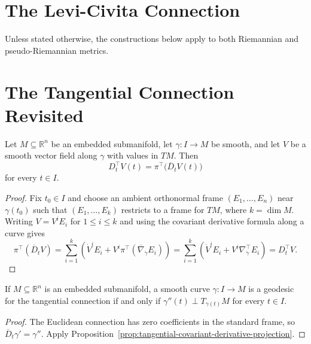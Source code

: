 \section{The Levi-Civita Connection}

Unless stated otherwise, the constructions below apply to both Riemannian and
pseudo-Riemannian metrics.

\section{The Tangential Connection Revisited}

\begin{proposition}
\label{prop:tangential-covariant-derivative-projection}

Let $M \subseteq \mathbb{R}^n$ be an embedded submanifold, let
$\gamma:I\to M$ be smooth, and let $V$ be a smooth vector field along
$\gamma$ with values in $TM$. Then
\[
D_t^\top V(t)=\pi^\top\bigl(\overline D_tV(t)\bigr)
\]
for every $t\in I$.

\begin{proof}
\sketch Fix $t_0\in I$ and choose an ambient orthonormal frame
$(E_1,\ldots,E_n)$ near $\gamma(t_0)$ such that
$(E_1,\ldots,E_k)$ restricts to a frame for $TM$, where $k=\dim M$.
Writing $V=V^iE_i$ for $1\leq i\leq k$ and using the covariant derivative
formula along a curve gives
\[
\pi^\top(\overline D_tV)
=\sum_{i=1}^k\left(\dot V^iE_i+V^i\pi^\top(\overline\nabla_{\dot\gamma}E_i)\right)
=\sum_{i=1}^k\left(\dot V^iE_i+V^i\nabla^\top_{\dot\gamma}E_i\right)
=D_t^\top V.
\]
\end{proof}
\end{proposition}

\begin{corollary}
\label{cor:geodesic-submanifold-acceleration}

If $M\subseteq\mathbb R^n$ is an embedded submanifold, a smooth curve
$\gamma:I\to M$ is a geodesic for the tangential connection if and only if
$\gamma''(t)\perp T_{\gamma(t)}M$ for every $t\in I$.

\begin{proof}
\sketch The Euclidean connection has zero coefficients in the standard frame,
so $\overline D_t\gamma'=\gamma''$. Apply
Proposition~\ref{prop:tangential-covariant-derivative-projection}.
\end{proof}
\end{corollary}

